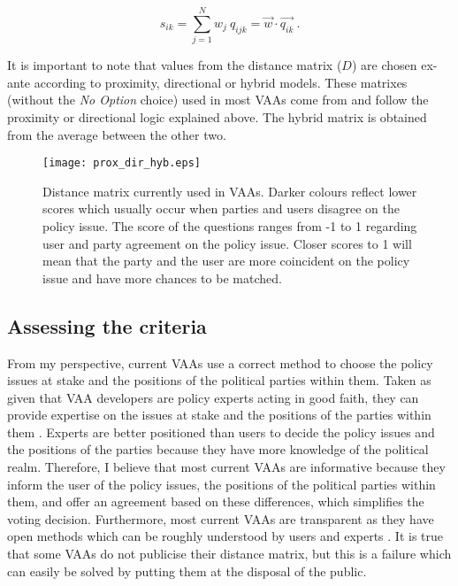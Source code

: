 \documentclass{scrartcl}
\begin{document}
\begin{equation}
    s_{ik} = \sum\limits_{j=1}^N w_j \: q_{ijk} = \Vec{w} \cdot \Vec{q_{ik}} \: .
    \label{eq:party_score}
\end{equation}

It is important to note that values from the distance matrix ($D$) are chosen ex-ante according to proximity,  directional or hybrid models. These matrixes (without the \textit{No Option} choice) used in most VAAs come from \cite{Mendez2012} and follow the proximity or directional logic explained above. The hybrid matrix is obtained from the average between the other two.  
\pagebreak

\begin{figure} [!h]
    \centering
    \centerline{\texttt{[image: prox\_dir\_hyb.eps]}}
    \caption{Distance matrix currently used in VAAs. Darker colours reflect lower scores which usually occur when parties and users disagree on the policy issue. The score of the questions ranges from -1 to 1 regarding user and party agreement on the policy issue. Closer scores to 1 will mean that the party and the user are more coincident on the policy issue and have more chances to be matched.}
    \label{fig:d_max}
\end{figure}

\subsection{Assessing the criteria}
 
From my perspective, current VAAs use a correct method to choose the policy issues at stake and the positions of the political parties within them. Taken as given that VAA developers are policy experts acting in good faith, they can provide expertise on the issues at stake and the positions of the parties within them \cite{Garzia2014}. Experts are better positioned than users to decide the policy issues and the positions of the parties because they have more knowledge of the political realm. Therefore, I believe that most current VAAs are informative because they inform the user of the policy issues, the positions of the political parties within them, and offer an agreement based on these differences, which simplifies the voting decision. Furthermore, most current VAAs are transparent as they have open methods which can be roughly understood by users and experts \cite{gemenis2013estimating}. It is true that some VAAs do not publicise their distance matrix, but this is a failure which can easily be solved by putting them at the disposal of the public.
\\
\end{document}
